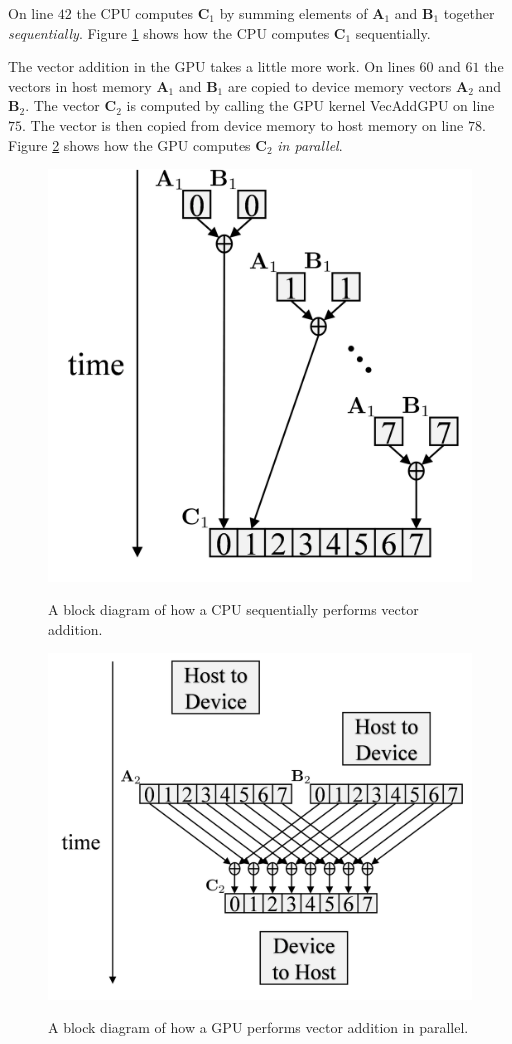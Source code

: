 On line $42$ the CPU computes $\mathbf{C}_1$ by summing elements of $\mathbf{A}_1$ and $\mathbf{B}_1$ together \textit{sequentially}. Figure \ref{fig:CPUaddBlockDiagram} shows how the CPU computes $\mathbf{C}_1$  sequentially.

The vector addition in the GPU takes a little more work. 
On lines $60$ and $61$ the vectors in host memory $\mathbf{A}_1$ and $\mathbf{B}_1$ are copied to device memory vectors $\mathbf{A}_2$ and $\mathbf{B}_2$.
The vector $\mathbf{C}_2$ is computed by calling the GPU kernel VecAddGPU on line $75$.
The vector is then copied from device memory to host memory on line $78$.
Figure \ref{fig:GPUaddBlockDiagram} shows how the GPU computes $\mathbf{C}_2$ \textit{in parallel}.
\begin{figure}
	\centering\includegraphics[width=3.17in/100*55]{figures/gpu_intro/CPUaddBlockDiagram.pdf}
	\label{fig:CPUaddBlockDiagram}
	\caption{A block diagram of how a CPU sequentially performs vector addition.}
\end{figure}
\begin{figure}
	\centering\includegraphics[width=4.69in/100*55]{figures/gpu_intro/GPUaddBlockDiagram.pdf}
	\label{fig:GPUaddBlockDiagram}
	\caption{A block diagram of how a GPU performs vector addition in parallel.}
\end{figure}

